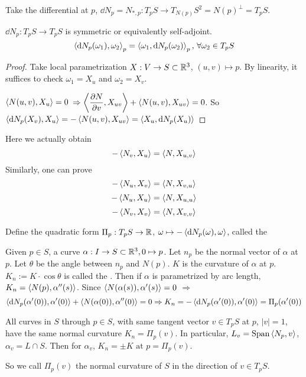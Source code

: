 Take the differential at  $ p $,  $ \dd N_p=N_{*,p}:T_pS\rightarrow T_{N(p)}S^2=N(p)^{\perp}=T_pS $.

\begin{proposition}
     $ \dd N_p:T_pS\rightarrow T_pS $ is symmetric or equivalently self-adjoint. \ie 
     \[\left<\mathrm{d} N_p(\omega_1),\omega_2\right>_p=\left<\omega_1,\mathrm{d} N_p(\omega_2)\right>_p,\,\forall \omega_2 \in T_pS\]
\end{proposition}
\begin{proof}
    Take local parametrization $ X :V\rightarrow S\subset \mathbb R^3 $,  $ (u,v)\mapsto p $.
    By linearity, it suffices to check  $ \omega_1=X_u $ and  $ \omega_2=X_v $.
    
     $ \left<N(u,v),X_u\right>=0 $  $ \Rightarrow\left<\displaystyle\frac{\partial N }{\partial v},X_{uv}\right>+\left<N(u,v),X_{uv}\right>=0 $. So  $ \left<\mathrm{d} N_p(X_v),X_u\right>=-\left<N(u,v),X_{uv}\right>=\left<X_u,\mathrm{d} N_p(X_u)\right> $ 
\end{proof}
\begin{remark}
    Here we actually obtain 
    \[-\left<N_v,X_u\right>=\left<N,X_{u,v}\right>\]
    Similarly, one can prove
    \[-\left<N_u,X_v\right>=\left<N,X_{v,u}\right>\]
    \[-\left<N_u,X_u\right>=\left<N,X_{u,u}\right>\]
    \[-\left<N_v,X_v\right>=\left<N,X_{v,v}\right>\]
\end{remark}
Define the quadratic form  $ \Pi_p:T_pS\rightarrow \mathbb R $,  $ \omega\mapsto -\left<\mathrm{d} N_p(\omega),\omega\right> $, called the   

\begin{definition}
    Given  $ p\in S $, a curve  $ \alpha:I\rightarrow S\subset \mathbb R^3, 0\mapsto p $. Let  $ n_p  $ be the normal vector of  $ \alpha  $ at  $ p  $. Let  $ \theta $ be the angle between  $ n_p $ and  $ N(p) $.  $ K  $ is the curvature of  $ \alpha  $ at  $ p $.  $ K_n:=K\cdot\cos\theta $ is called the . Then if  $ \alpha $ is parametrized by arc length,  $ K_n=\left<N(p),\alpha''(s)\right> $. Since $ \left<N(\alpha(s)),\alpha'(s)\right>=0 $ $ \Rightarrow $ 
    \[\left<\mathrm{d} N_p(\alpha'(0)),\alpha'(0)\right>+\left<N(\alpha(0)),\alpha''(0)\right>=0\Rightarrow K_n=-\left<\mathrm{d} N_p(\alpha'(0)),\alpha'(0)\right>=\Pi_p(\alpha'(0))\]

    
\end{definition}
\begin{theorem}[Meusnier]\label{Meusnier theorem}
    All curves in  $ S $ through  $ p\in S $, with same tangent vector  $ v\in T_pS $ at  $ p $,  $ |v|=1 $, have the same normal curvature  $ K_n=\Pi_p(v) $. In particular,  $ L_v=\mathrm{Span}\left<N_p,v\right> $,  $ \alpha_v=L\cap S $. Then for  $ \alpha_v $,  $ K_n=\pm K\text{ at }p=\Pi_p(v) $. 
    
    So we call  $ \Pi_p(v) $ the normal curvature of  $ S $ in the direction of  $ v\in T_pS $.  
\end{theorem}
\tikzset{external/export=true}